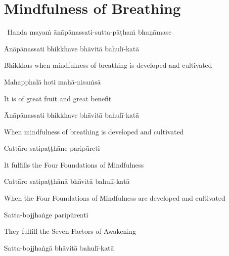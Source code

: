 \suttaRef{[SN 45.8]}

\enlargethispage{\baselineskip\vspace{-0.5em}}

\section{Mindfulness of Breathing}
\label{mindfulness-of-breathing}

\begin{leader}
  \anglebracketleft\ \hspace{-0.5mm}Handa mayaṁ ānāpānassati-sutta-pāṭhaṁ bhaṇāmase \hspace{-0.5mm}\anglebracketright\
\end{leader}

Ānāpānassati bhikkhave bhāvitā bahulī-katā

\begin{english}
  Bhikkhus when mindfulness of breathing is developed and cultivated
\end{english}

Mahapphalā hoti mahā-nisaṁsā

\begin{english}
  It is of great fruit and great benefit
\end{english}

Ānāpānassati bhikkhave bhāvitā bahulī-katā

\begin{english}
  When mindfulness of breathing is developed and cultivated
\end{english}

Cattāro satipaṭṭhāne paripūreti

\begin{english}
  It fulfills the Four Foundations of Mindfulness
\end{english}

Cattāro satipaṭṭhānā bhāvitā bahulī-katā

\begin{english-hang}
  When the Four Foundations of Mindfulness are developed and cultivated
\end{english-hang}

Satta-bojjhaṅge paripūrenti

\begin{english}
  They fulfill the Seven Factors of Awakening
\end{english}

Satta-bojjhaṅgā bhāvitā bahulī-katā

